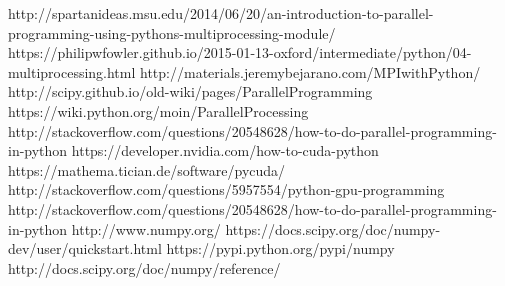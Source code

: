 \documentclass[11pt,a4paper]{article}
\begin{document}
\begin{thebibliography}{li}
        \bibitem  http://spartanideas.msu.edu/2014/06/20/an-introduction-to-parallel-programming-using-pythons-multiprocessing-module/
        \bibitem  https://philipwfowler.github.io/2015-01-13-oxford/intermediate/python/04-multiprocessing.html
        \bibitem  http://materials.jeremybejarano.com/MPIwithPython/
        \bibitem  http://scipy.github.io/old-wiki/pages/ParallelProgramming
        \bibitem  https://wiki.python.org/moin/ParallelProcessing
        \bibitem  http://stackoverflow.com/questions/20548628/how-to-do-parallel-programming-in-python
        \bibitem  https://developer.nvidia.com/how-to-cuda-python
        \bibitem  https://mathema.tician.de/software/pycuda/
        \bibitem  http://stackoverflow.com/questions/5957554/python-gpu-programming
        \bibitem  http://stackoverflow.com/questions/20548628/how-to-do-parallel-programming-in-python
        \bibitem  http://www.numpy.org/
        \bibitem  https://docs.scipy.org/doc/numpy-dev/user/quickstart.html
        \bibitem  https://pypi.python.org/pypi/numpy
        \bibitem  http://docs.scipy.org/doc/numpy/reference/
\end{thebibliography}
\end{document}
